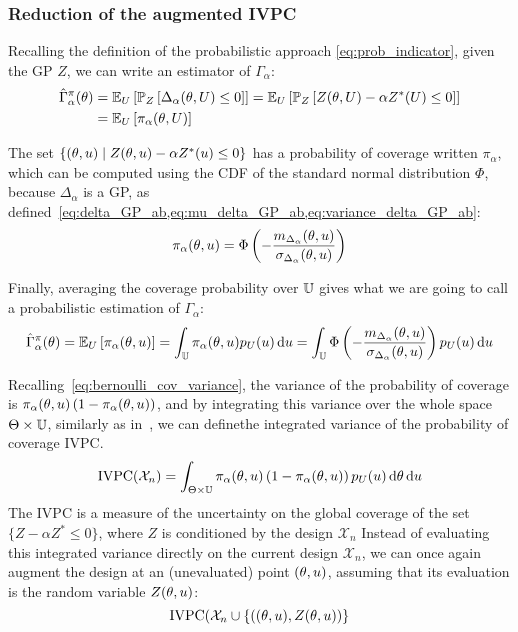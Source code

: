 \documentclass[../../Main_ManuscritThese.tex]{subfiles}
\begin{document}
\subsubsection{Reduction of the augmented IVPC}

Recalling the definition of the probabilistic approach
\cref{eq:prob_indicator}, given the GP $Z$, we can write an estimator
of $\Gamma_{\alpha}$:
\begin{align}
  \hat{\Gamma}_{\alpha}^{\pi}(\theta) &= \mathbb{E}_U\left[ \mathbb{P}_{Z}\left[ \Delta_{\alpha}(\theta,U) \leq 0\right]\right] = \mathbb{E}_U\left[ \mathbb{P}_{Z}\left[ Z(\theta, U) - \alpha Z^*(U) \leq 0\right]\right] \\
                                   &= \mathbb{E}_U\left[\pi_{\alpha}(\theta,U)\right]
\end{align}


The set $\{(\theta, u) \mid Z(\theta, u) - \alpha Z^*(u)\leq 0\}$ has
a probability of coverage written $\pi_{\alpha}$, which can be
computed using the CDF of the standard normal distribution $\Phi$,
because $\Delta_{\alpha}$ is a GP, as
defined~\cref{eq:delta_GP_ab,eq:mu_delta_GP_ab,eq:variance_delta_GP_ab}:
\begin{equation}
  \label{eq:def_pialphaku}
  \pi_{\alpha}(\theta,u) = \Phi\left(-\frac{m_{\Delta_\alpha}(\theta,u)}{\sigma_{\Delta_\alpha}(\theta,u)}\right)
\end{equation}

Finally, averaging the coverage probability over $\mathbb{U}$ gives what
we are going to call a probabilistic estimation of $\Gamma_{\alpha}$:
\begin{equation}
  \hat{\Gamma}_{\alpha}^{\pi}(\theta) = \mathbb{E}_U\left[\pi_{\alpha}(\theta,u)\right]=\int_{\mathbb{U}}\pi_{\alpha}(\theta,u)p_{U}(u) \,\mathrm{d}u = \int_{\mathbb{U}}\Phi\left(-\frac{m_{\Delta_\alpha}(\theta,u)}{\sigma_{\Delta_\alpha}(\theta,u)}\right)p_{U}(u) \,\mathrm{d}u
\end{equation}

Recalling~\cref{eq:bernoulli_cov_variance}, the variance of the
probability of coverage is
$\pi_\alpha(\theta, u) \left(1 - \pi_{\alpha}(\theta,u)\right)$, and by
integrating this variance over the whole space
$\Theta \times \mathbb{U}$, similarly as in~\cite{bect_sequential_2012},
we can definethe integrated variance of the probability of coverage
$\mathrm{IVPC}$.
\begin{equation}
  \label{eq:IVPC_def}
  \mathrm{IVPC}(\mathcal{X}_n) =  \int_{\Theta \times \mathbb{U}} \pi_{\alpha}(\theta, u) \left(1 - \pi_{\alpha}(\theta, u)\right)p_{U}(u)\,\mathrm{d}\theta \,\mathrm{d}u
\end{equation}
The $\mathrm{IVPC}$ is a measure of the uncertainty on the global
coverage of the set $\{Z - \alpha Z^* \leq 0\}$, where $Z$ is
conditioned by the design $\mathcal{X}_n$ Instead of evaluating this
integrated variance directly on the current design $\mathcal{X}_n$, we
can once again augment the design at an (unevaluated) point
$(\theta, u)$, assuming that its evaluation is the random variable
$Z(\theta, u)$:
\begin{equation}
  \mathrm{IVPC}(\mathcal{X}_n \cup \{((\theta, u), Z(\theta, u))\}
\end{equation}
\end{document}
